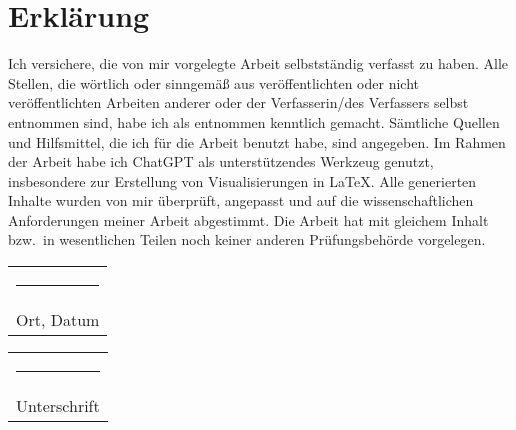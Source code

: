 \chapter*{Erklärung}
%
Ich versichere, die von mir vorgelegte Arbeit selbstständig verfasst zu haben. Alle Stellen, die wörtlich oder sinngemäß aus veröffentlichten oder nicht veröffentlichten Arbeiten anderer oder der Verfasserin/des Verfassers selbst entnommen sind, habe ich als entnommen kenntlich gemacht. Sämtliche Quellen und Hilfsmittel, die ich für die Arbeit benutzt habe, sind angegeben. Im Rahmen der Arbeit habe ich ChatGPT als unterstützendes Werkzeug genutzt, insbesondere zur Erstellung von Visualisierungen in LaTeX. Alle generierten Inhalte wurden von mir überprüft, angepasst und auf die wissenschaftlichen Anforderungen meiner Arbeit abgestimmt.  Die Arbeit hat mit gleichem Inhalt bzw.\ in wesentlichen Teilen noch keiner anderen Prüfungsbehörde vorgelegen.
\\[3cm] 
\begin{tabular}{@{}l@{}}%
\rule{0.35\textwidth}{0.4pt}\\
Ort, Datum%
\end{tabular}%
\hfill%
\begin{tabular}{@{}l@{}}%
\rule{0.45\textwidth}{0.4pt}\\
Unterschrift%
\end{tabular}%